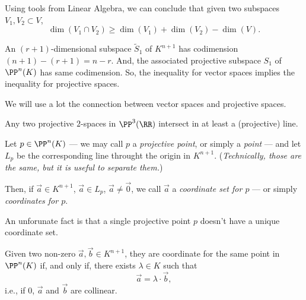 
\begin{sk}
	Using tools from Linear Algebra, we can conclude that given two subspaces $V_1, V_2 \subset V$, \[
		\dim(V_1 \cap V_2) \ge \dim(V_1) + \dim(V_2) - \dim(V). 
	\]

	An $(r+1)$-dimensional subspace $\tilde S_1$ of $K^{n+1}$ has codimension $(n+1) - (r+1) = n - r$. And, the associated projective subspace $S_1$ of $\PP^n(K)$ has same codimension. So, the inequality for vector spaces implies the inequality for projective spaces.
\end{sk}

We will use a lot the connection between vector spaces and projective spaces.

\begin{exmp}
	Any two projective $2$-spaces in $\PP^3(\RR)$ intersect in at least a (projective) line.
\end{exmp}

\begin{defn}
	Let $p \in \PP^n(K)$ --- we may call $p$ a \emph{projective point}, or simply a \emph{point} --- and let $L_p$ be the corresponding line throught the origin in $K^{n+1}$. (\emph{Technically, those are the same, but it is useful to separate them.})

	Then, if $\vec a \in K^{n+1}$, $\vec a \in L_p$, $\vec a \neq \vec 0$, we call  $\vec a$ a \emph{coordinate set for $p$} --- or simply \emph{coordinates for $p$}.
\end{defn}

An unforunate fact is that a single projective point $p$ doesn't have a unique coordinate set.

\begin{prop}
	Given two non-zero $\vec a, \vec b \in K^{n+1}$, they are coordinate for the same point in $\PP^n(K)$ if, and only if, there exists $\lambda \in K$ such that \[
		\vec a = \lambda \cdot \vec b,
	\]
	i.e., if $0$, $\vec a$ and $\vec b$ are collinear.
\end{prop}

